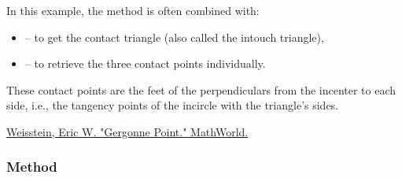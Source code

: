 \medskip
\noindent
In this example, the method is often combined with:
\begin{itemize}
  \item {} – to get the contact triangle (also called the intouch triangle),
  \item {} – to retrieve the three contact points individually.
\end{itemize}

\medskip
\noindent
These contact points are the feet of the perpendiculars from the incenter to each side, i.e., the tangency points of the incircle with the triangle’s sides.
\begin{flushright}
\small
\href{https://mathworld.wolfram.com/GergonnePoint.html}{Weisstein, Eric W. "Gergonne Point." MathWorld.}
\end{flushright}

\vspace{1em}

\begin{minipage}{.5\textwidth}
\begin{center}
\end{center}
\end{minipage}
\begin{minipage}{.5\textwidth}
\begin{tkzexample}
\end{tkzexample}
\end{minipage}

\subsubsection{Method } %
\label{ssub:method_triangle_nagel__point}

